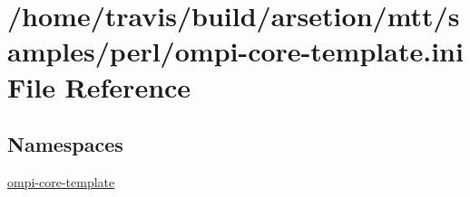\hypertarget{ompi-core-template_8ini}{\section{/home/travis/build/arsetion/mtt/samples/perl/ompi-\/core-\/template.ini File Reference}
\label{ompi-core-template_8ini}
}
\subsection*{Namespaces}
\begin{DoxyCompactItemize}
\item 
\hyperlink{namespaceompi-core-template}{ompi-\/core-\/template}
\end{DoxyCompactItemize}
